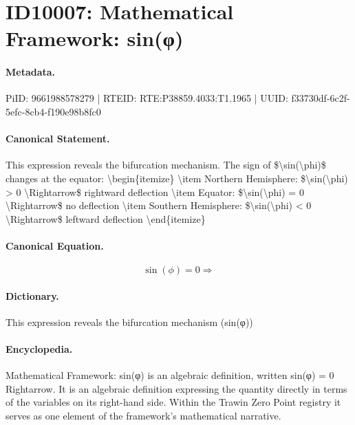\section*{ID10007: Mathematical Framework: sin(φ)}
\paragraph{Metadata.}
PiID: 9661988578279 | RTEID: RTE:P38859.4033:T1.1965 | UUID: f33730df-6c2f-5efc-8cb4-f190e98b8fc0

\paragraph{Canonical Statement.}
This expression reveals the bifurcation mechanism. The sign of \$\textbackslash{}sin(\textbackslash{}phi)\$ changes at the equator: \textbackslash{}begin\{itemize\} \textbackslash{}item Northern Hemisphere: \$\textbackslash{}sin(\textbackslash{}phi) > 0 \textbackslash{}Rightarrow\$ rightward deflection \textbackslash{}item Equator: \$\textbackslash{}sin(\textbackslash{}phi) = 0 \textbackslash{}Rightarrow\$ no deflection \textbackslash{}item Southern Hemisphere: \$\textbackslash{}sin(\textbackslash{}phi) < 0 \textbackslash{}Rightarrow\$ leftward deflection \textbackslash{}end\{itemize\}

\paragraph{Canonical Equation.}
\[
\sin(\phi) = 0 \Rightarrow
\]

\paragraph{Dictionary.}
This expression reveals the bifurcation mechanism (sin(φ))

\paragraph{Encyclopedia.}
Mathematical Framework: sin(φ) is an algebraic definition, written sin(φ) = 0 Rightarrow. It is an algebraic definition expressing the quantity directly in terms of the variables on its right-hand side. Within the Trawin Zero Point registry it serves as one element of the framework's mathematical narrative.
